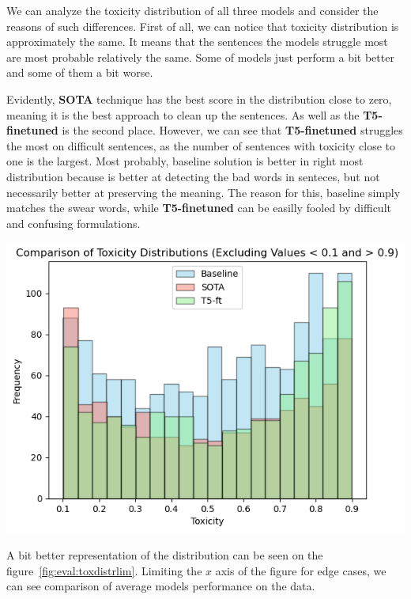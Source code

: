 \begin{multicols*}{2}
We can analyze the toxicity distribution of all three models and consider the
reasons of such differences. First of all, we can notice that toxicity
distribution is approximately the same. It means that the sentences the models
struggle most are most probable relatively the same. Some of models just
perform a bit better and some of them a bit worse.

Evidently, \textbf{SOTA} technique has the best score in the distribution close
to zero, meaning it is the best approach to clean up the sentences. As well as
the \textbf{T5-finetuned} is the second place. However, we can see that
\textbf{T5-finetuned} struggles the most on difficult sentences, as the number
of sentences with toxicity close to one is the largest. Most probably, baseline
solution is better in right most distribution because is better at detecting
the bad words in senteces, but not necessarily better at preserving the
meaning. The reason for this, baseline simply matches the swear words, while
\textbf{T5-finetuned} can be easilly fooled by difficult and confusing
formulations.

\begin{minipage}{0.9\linewidth}
    \includegraphics[scale=0.35]{figures/final/toxicity-limited.png}%
    \label{fig:eval:toxdistrlim}%
\end{minipage}

A bit better representation of the distribution can be seen on the
figure~\ref{fig:eval:toxdistrlim}. Limiting the \(x\) axis of the figure for
edge cases, we can see comparison of average models performance on the data.


\end{multicols*}
